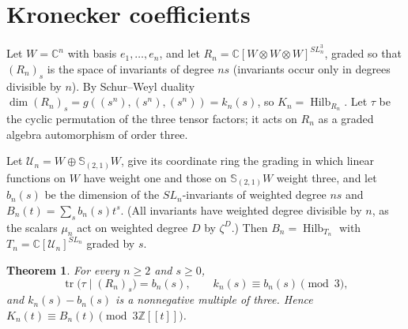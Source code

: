 \documentclass[11pt,a4paper]{article}
\newtheorem{theorem}{Theorem}[section]
\theoremstyle{definition}
\newcommand{\C}{\mathbb{C}}
\newcommand{\Z}{\mathbb{Z}}
\newcommand{\Hilb}{\operatorname{Hilb}}
\newcommand{\tr}{\operatorname{tr}}
\begin{document}
\section{Kronecker coefficients}\label{sec:kronecker}

Let $W=\C^n$ with basis $e_1,\dots,e_n$, and let $R_n=\C[W\otimes W\otimes W]
^{SL_n^3}$, graded so that $(R_n)_s$ is the space of invariants of degree $ns$
(invariants occur only in degrees divisible by $n$). By Schur--Weyl duality
$\dim(R_n)_s=g((s^n),(s^n),(s^n))=k_n(s)$, so $K_n=\Hilb_{R_n}$. Let $\tau$ be
the cyclic permutation of the three tensor factors; it acts on $R_n$ as a
graded algebra automorphism of order three.

Let $\mathcal U_n=W\oplus\mathbb S_{(2,1)}W$, give its coordinate ring the
grading in which linear functions on $W$ have weight one and those on
$\mathbb S_{(2,1)}W$ weight three, and let $b_n(s)$ be the dimension of the
$SL_n$-invariants of weighted degree $ns$ and $B_n(t)=\sum_sb_n(s)t^s$. (All
invariants have weighted degree divisible by $n$, as the scalars $\mu_n$ act
on weighted degree $D$ by $\zeta^D$.) Then $B_n=\Hilb_{T_n}$ with
$T_n=\C[\mathcal U_n]^{SL_n}$ graded by $s$.

\begin{theorem}\label{thm:K023}
For every $n\ge2$ and $s\ge0$,
\[
 \tr\bigl(\tau\mid(R_n)_s\bigr)=b_n(s),\qquad k_n(s)\equiv b_n(s)\pmod3 ,
\]
and $k_n(s)-b_n(s)$ is a nonnegative multiple of three. Hence
$K_n(t)\equiv B_n(t)\pmod{3\Z[[t]]}$.
\end{theorem}
\end{document}
